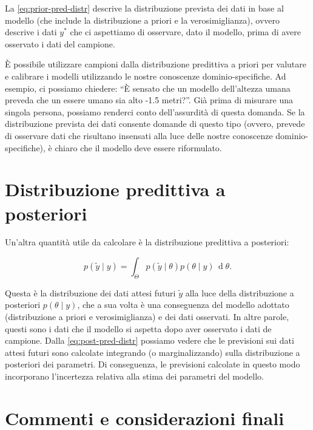 \documentclass[
]{book}
\theoremstyle{definition}
\theoremstyle{definition}
\theoremstyle{definition}
\theoremstyle{definition}
\theoremstyle{remark}
\begin{document}
La \eqref{eq:prior-pred-distr} descrive la distribuzione prevista dei dati in base al modello (che include la distribuzione a priori e la verosimiglianza), ovvero descrive i dati \(y^*\) che ci aspettiamo di osservare, dato il modello, prima di avere osservato i dati del campione.

È possibile utilizzare campioni dalla distribuzione predittiva a priori per valutare e calibrare i modelli utilizzando le nostre conoscenze dominio-specifiche. Ad esempio, ci possiamo chiedere: ``È sensato che un modello dell'altezza umana preveda che un essere umano sia alto -1.5 metri?''. Già prima di misurare una singola persona, possiamo renderci conto dell'assurdità di questa domanda. Se la distribuzione prevista dei dati consente domande di questo tipo (ovvero, prevede di osservare dati che risultano insensati alla luce delle nostre conoscenze dominio-specifiche), è chiaro che il modello deve essere riformulato.

\hypertarget{distribuzione-predittiva-a-posteriori}{%
\section{Distribuzione predittiva a posteriori}\label{distribuzione-predittiva-a-posteriori}}

Un'altra quantità utile da calcolare è la distribuzione predittiva a posteriori:

\begin{equation}
p(\tilde{y} \mid y) = \int_\Theta p(\tilde{y} \mid \theta) p(\theta \mid y) \,\operatorname {d}\!\theta .
\label{eq:post-pred-distr}
\end{equation}

Questa è la distribuzione dei dati attesi futuri \(\tilde{y}\) alla luce della distribuzione a posteriori \(p(\theta \mid y)\), che a sua volta è una conseguenza del modello adottato (distribuzione a priori e verosimiglianza) e dei dati osservati. In altre parole, questi sono i dati che il modello si aspetta dopo aver osservato i dati de campione. Dalla \eqref{eq:post-pred-distr} possiamo vedere che le previsioni sui dati attesi futuri sono calcolate integrando (o marginalizzando) sulla distribuzione a posteriori dei parametri. Di conseguenza, le previsioni calcolate in questo modo incorporano l'incertezza relativa alla stima dei parametri del modello.

\hypertarget{commenti-e-considerazioni-finali}{%
\section*{Commenti e considerazioni finali}\label{commenti-e-considerazioni-finali}}
\end{document}
